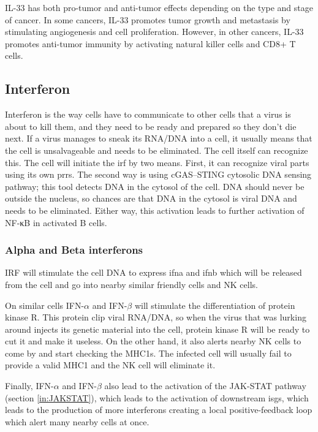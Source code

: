 IL-33 has both pro-tumor and anti-tumor effects depending on the type and stage of cancer. In some cancers, IL-33 promotes tumor growth and metastasis by stimulating angiogenesis and cell proliferation. However, in other cancers, IL-33 promotes anti-tumor immunity by activating natural killer cells and CD8+ T cells.

\subsection{Interferon}
\label{in:inter}

Interferon is the way cells have to communicate to other cells that a virus is about to kill them, and they need to be ready and prepared so they don't die next. If a virus manages to sneak its RNA/DNA into a cell, it usually means that the cell is unsalvageable and needs to be eliminated. The cell itself can recognize this. The cell will initiate the \gls{irf} by two means. First, it can recognize viral parts using its own \gls{prrs}. The second way is using cGAS–STING cytosolic DNA sensing pathway; this tool detects DNA in the cytosol of the cell. DNA should never be outside the nucleus, so chances are that DNA in the cytosol is viral DNA and needs to be eliminated. Either way, this activation leads to further activation of NF-κB in activated B cells.

\subsubsection{Alpha and Beta interferons}

IRF will stimulate the cell DNA to express \gls{ifna} and \gls{ifnb} which will be released from the cell and go into nearby similar friendly cells and NK cells.

On similar cells IFN-$\alpha$ and IFN-$\beta$ will stimulate the differentiation of protein kinase R. This protein clip viral RNA/DNA, so when the virus that was lurking around injects its genetic material into the cell, protein kinase R will be ready to cut it and make it useless. On the other hand, it also alerts nearby NK cells to come by and start checking the MHC1s. The infected cell will usually fail to provide a valid MHC1 and the NK cell will eliminate it.

Finally, IFN-$\alpha$ and IFN-$\beta$ also lead to the activation of the JAK-STAT pathway (section \ref{in:JAKSTAT}), which leads to the activation of downstream \gls{isgs}, which leads to the production of more interferons creating a local positive-feedback loop which alert many nearby cells at once.

